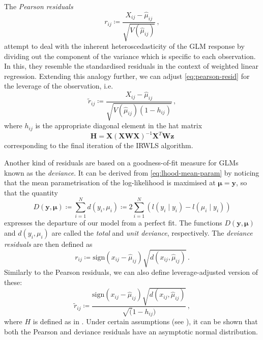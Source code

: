\documentclass[a4paper]{book}
\begin{document}
The \emph{Pearson residuals}
\begin{equation} \label{eq:pearson-resid}
  r_{ij} \coloneqq \frac{X_{ij} - \widehat{\mu}_{ij}}{\sqrt{V(\widehat{\mu}_{ij})}} \,,
\end{equation}
attempt to deal with the inherent heteroscedasticity of the GLM response by dividing out the component of the variance which is specific to each observation. In this, they resemble the standardised residuals in the context of weighted linear regression. Extending this analogy further, we can adjust \cref{eq:pearson-resid} for the leverage of the observation, i.e.
\begin{equation}
  \tilde{r}_{ij} \coloneqq \frac{X_{ij} - \widehat{\mu}_{ij}}{\sqrt{V(\widehat{\mu}_{ij}) (1 - h_{ij})}} \,,
\end{equation}
where $h_{ij}$ is the appropriate diagonal element in the hat matrix
\begin{equation} \label{eq:glm-H-mat}
  \mathbf{H} = \mathbf{X} (\mathbf{XWX})^{-1} \mathbf{X}^T \mathbf{W} \mathbf{z}
\end{equation}
corresponding to the final iteration of the IRWLS algorithm.

Another kind of residuals are based on a goodness-of-fit measure for GLMs known as the \emph{deviance}. It can be derived from \cref{eq:lhood-mean-param} by noticing that the mean parametrisation of the log-likelihood is maximised at $\bm{\mu} = \mathbf{y}$, so that the quantity
\begin{equation}
  D(\mathbf{y}, \bm{\mu}) \coloneqq \sum_{i = 1}^N d(y_i, \mu_i) \coloneqq 2 \sum_{i = 1}^N (l(y_i \mid y_i) - l(\widehat{\mu}_i \mid y_i)) 
\end{equation}
expresses the departure of our model from a perfect fit. The functions $D(\mathbf{y}, \bm{\mu})$ and $d(y_i, \mu_i)$ are called the \emph{total} and \emph{unit deviance}, respectively. The \emph{deviance residuals} are then defined as
\begin{equation}
  r_{ij} \coloneqq \mathrm{sign}(x_{ij} - \widehat{\mu}_{ij}) \sqrt{d(x_{ij}, \widehat{\mu}_{ij})} \,.
\end{equation}
Similarly to the Pearson residuals, we can also define leverage-adjusted version of these:
\begin{equation}
  \tilde{r}_{ij} \coloneqq \frac{\mathrm{sign}(x_{ij} - \widehat{\mu}_{ij}) \sqrt{d(x_{ij}, \widehat{\mu}_{ij})}}{\sqrt(1 - h_{ij})} \,,
\end{equation}
where $H$ is defined as in . Under certain assumptions (see \cite[Section 7.5]{dunn:rand-quant-res}), it can be shown that both the Pearson and deviance residuals have an asymptotic normal distribution.
\end{document}
